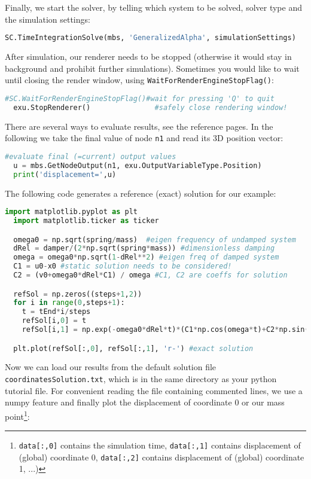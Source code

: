 %
Finally, we start the solver, by telling which system to be solved, solver type and the simulation settings:
\begin{lstlisting}[language=Python, firstnumber=45]
  SC.TimeIntegrationSolve(mbs, 'GeneralizedAlpha', simulationSettings)
\end{lstlisting}
%

After simulation, our renderer needs to be stopped (otherwise it would stay in background and prohibit further simulations). 
Sometimes you would like to wait until closing the render window, using \texttt{WaitForRenderEngineStopFlag()}:
\begin{lstlisting}[language=Python, firstnumber=46]
  #SC.WaitForRenderEngineStopFlag()#wait for pressing 'Q' to quit
  exu.StopRenderer()               #safely close rendering window!
\end{lstlisting}
%
There are several ways to evaluate results, see the reference pages. In the following we take the final value of node \texttt{n1} and read its 3D position vector:
\begin{lstlisting}[language=Python, firstnumber=48]
  #evaluate final (=current) output values
  u = mbs.GetNodeOutput(n1, exu.OutputVariableType.Position)
  print('displacement=',u)
\end{lstlisting}
%
The following code generates a reference (exact) solution for our example:
\begin{lstlisting}[language=Python, firstnumber=51]
  import matplotlib.pyplot as plt
  import matplotlib.ticker as ticker

  omega0 = np.sqrt(spring/mass)  #eigen frequency of undamped system
  dRel = damper/(2*np.sqrt(spring*mass)) #dimensionless damping
  omega = omega0*np.sqrt(1-dRel**2) #eigen freq of damped system
  C1 = u0-x0 #static solution needs to be considered!
  C2 = (v0+omega0*dRel*C1) / omega #C1, C2 are coeffs for solution

  refSol = np.zeros((steps+1,2))
  for i in range(0,steps+1):
    t = tEnd*i/steps
    refSol[i,0] = t
    refSol[i,1] = np.exp(-omega0*dRel*t)*(C1*np.cos(omega*t)+C2*np.sin(omega*t))+x0

  plt.plot(refSol[:,0], refSol[:,1], 'r-') #exact solution
\end{lstlisting}
%
Now we can load our results from the default solution file \texttt{coordinatesSolution.txt}, which is in the same
directory as your python tutorial file. For convenient reading the file containing commented lines, we use a numpy feature and
finally plot the displacement of coordinate 0 or our mass point\footnote{\texttt{data[:,0]} contains the simulation time, \texttt{data[:,1]} contains displacement of (global) coordinate 0, \texttt{data[:,2]} contains displacement of (global) coordinate 1, ...)}:
